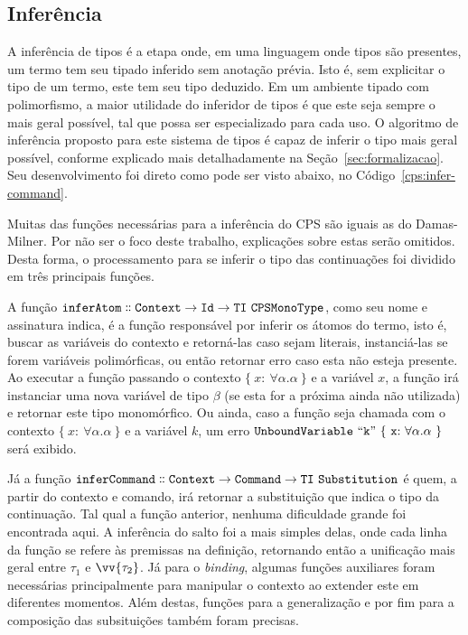 \subsection{Inferência}\label{subsec:cps-inferer}
A inferência de tipos é a etapa onde, em uma linguagem onde tipos são presentes, um termo tem seu tipado inferido sem anotação prévia.
Isto é, sem explicitar o tipo de um termo, este tem seu tipo deduzido.
Em um ambiente tipado com polimorfismo, a maior utilidade do inferidor de tipos é que este seja sempre o mais geral possível, tal que possa ser especializado para cada uso.
O algoritmo de inferência proposto para este sistema de tipos é capaz de inferir o tipo mais geral possível, conforme explicado mais detalhadamente na Seção~\ref{sec:formalizacao}.
Seu desenvolvimento foi direto como pode ser visto abaixo, no Código~\ref{cps:infer-command}.


Muitas das funções necessárias para a inferência do CPS são iguais as do Damas-Milner.
Por não ser o foco deste trabalho, explicações sobre estas serão omitidos.
Desta forma, o processamento para se inferir o tipo das continuações foi dividido em três principais funções.

A função $\mathtt{inferAtom \dblcolon Context \to Id \to TI\ CPSMonoType}$, como seu nome e assinatura indica, é a função responsável por inferir os átomos do termo, isto é, buscar as variáveis do contexto e retorná-las caso sejam literais, instanciá-las se forem variáveis polimórficas, ou então retornar erro caso esta não esteja presente.
Ao executar a função passando o contexto $\{\ x{:}\ \forall\alpha.\alpha \ \}$ e a variável $x$, a função irá instanciar uma nova variável de tipo $\beta$ (se esta for a próxima ainda não utilizada) e retornar este tipo monomórfico.
Ou ainda, caso a função seja chamada com o contexto $\{\ x{:}\ \forall\alpha.\alpha \ \}$ e a variável $k$, um erro $\mathtt{UnboundVariable\ ``k"\ \{\ x{:}\ \forall\alpha.\alpha \ \}}$ será exibido.

Já a função $\mathtt{inferCommand \dblcolon Context \to Command \to TI\ Substitution}$ é quem, a partir do contexto e comando, irá retornar a substituição que indica o tipo da continuação.
Tal qual a função anterior, nenhuma dificuldade grande foi encontrada aqui.
A inferência do salto foi a mais simples delas, onde cada linha da função se refere às premissas na definição, retornando então a unificação mais geral entre $\tau_1$ e $\vv{\tau_2}$.
Já para o \textit{binding}, algumas funções auxiliares foram necessárias principalmente para manipular o contexto ao extender este em diferentes momentos.
Além destas, funções para a generalização e por fim para a composição das subsituições também foram precisas.

